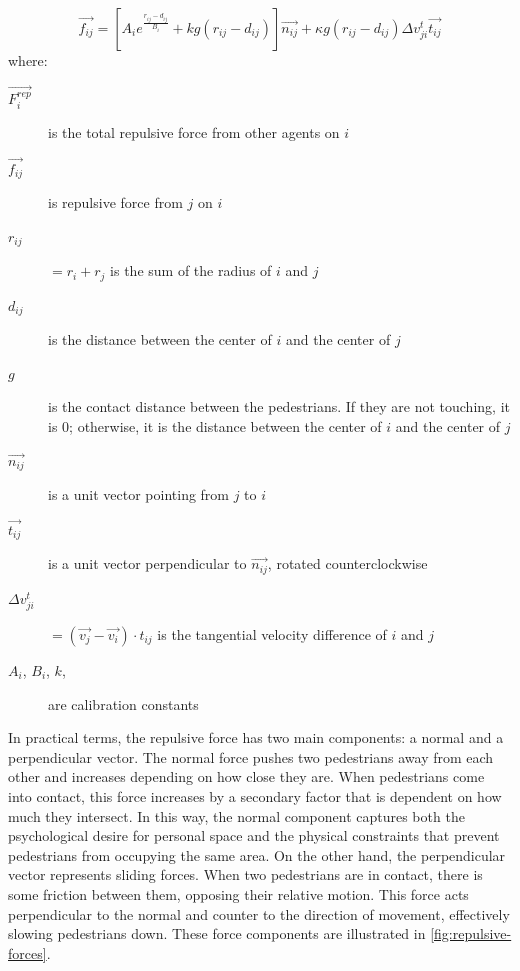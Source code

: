\documentclass[twoside, 11pt]{article}
\begin{document}
\begin{equation}
  \vec{f_{ij}} = [A_ie^{\frac{r_{ij} - d_{ij}}{B_i}} + kg(r_{ij}-d_{ij})]\vec{n_{ij}} + \kappa g (r_{ij} - d_{ij})\Delta v_{ji}^t \vec{t_{ij}}
  \label{eq:pedestrian_repulsion}
\end{equation}
where:
\begin{description}
  \item[$\vec{F_i^{rep}}$] is the total repulsive force from other agents on $i$
  \item[$\vec{f_{ij}}$] is repulsive force from $j$ on $i$
  
  \item[$r_{ij}$] $= r_i + r_j$ is the sum of the radius of $i$ and $j$
  \item[$d_{ij}$] is the distance between the center of $i$ and the center of $j$
  \item[$g$] is the contact distance between the pedestrians. If they are not touching, it is $0$; otherwise, it is the distance between the center of $i$ and the center of $j$
  \item[$\vec{n_{ij}}$] is a unit vector pointing from $j$ to $i$
  \item[$\vec{t_{ij}}$] is a unit vector perpendicular to $\vec{n_{ij}}$, rotated counterclockwise
  \item[$\Delta v_{ji}^t$] $= (\vec{v_j} - \vec{v_i}) \cdot t_{ij}$ is the tangential velocity difference of $i$ and $j$
  \item[$A_i$, $B_i$, $k$, \kappa] are calibration constants
\end{description}

In practical terms, the repulsive force has two main components: a normal and a perpendicular vector. The normal force pushes two pedestrians away from each other and increases depending on how close they are. When pedestrians come into contact, this force increases by a secondary factor that is dependent on how much they intersect. In this way, the normal component captures both the psychological desire for personal space and the physical constraints that prevent pedestrians from occupying the same area. On the other hand, the perpendicular vector represents sliding forces. When two pedestrians are in contact, there is some friction between them, opposing their relative motion. This force acts perpendicular to the normal and counter to the direction of movement, effectively slowing pedestrians down. These force components are illustrated in \autoref{fig:repulsive-forces}.
\end{document}
